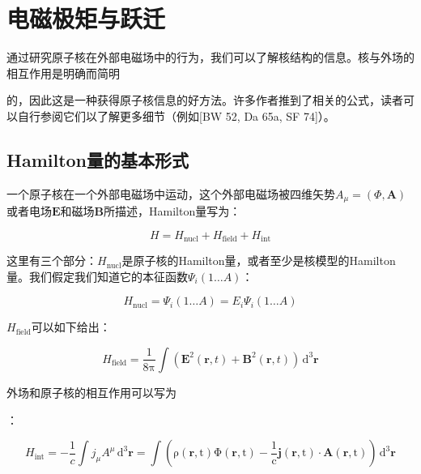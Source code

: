
\chapter{电磁极矩与跃迁}

通过研究原子核在外部电磁场中的行为，我们可以了解核结构的信息。核与外场的相互作用是明确而简明

的，因此这是一种获得原子核信息的好方法。许多作者推到了相关的公式，读者可以自行参阅它们以了解更多细节（例如{[}BW 52, Da
65a, SF 74{]}）。

\section{Hamilton量的基本形式}

一个原子核在一个外部电磁场中运动，这个外部电磁场被四维矢势$A_{\mu}=(\Phi,\boldsymbol{A})$或者电场$\boldsymbol{E}$和磁场$\boldsymbol{B}$所描述，Hamilton量写为：

\begin{equation}
H=H_{\text{nucl}}+H_{\text{field}}+H_{\text{int}}
\end{equation}

这里有三个部分：$H_{\text{nucl}}$是原子核的Hamilton量，或者至少是核模型的Hamilton量。我们假定我们知道它的本征函数$\Psi_{i}(1\dots A)$：

\begin{equation}
H_{\text{nucl}}=\Psi_{i}(1\dots A)=E_{i}\Psi_{i}(1\dots A)
\end{equation}

$H_{\text{field}}$可以如下给出：

\begin{equation}
H_{\text{field}}=\frac{1}{8\mathrm{\pi}}\int\left(\boldsymbol{E}^{2}(\boldsymbol{r},t)+\boldsymbol{B}^{2}(\boldsymbol{r},t)\right)\,\mathrm{d}^{3}\boldsymbol{r}
\end{equation}

外场和原子核的相互作用可以写为

：

\begin{equation}
H_{\text{int}}=-\frac{1}{c}\int j_{\mu}A^{\mu}\,\mathrm{d^{3}\boldsymbol{r}=\int\left(\rho(\boldsymbol{r},t)\Phi(\boldsymbol{r},t)-\frac{1}{c}\boldsymbol{j}(\boldsymbol{r},t)\cdot\boldsymbol{A}(\boldsymbol{r},t)\right)\,\mathrm{d}^{3}\boldsymbol{r}}
\end{equation}

